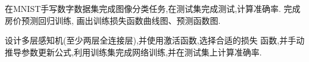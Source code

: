 在MNIST手写数字数据集完成图像分类任务,在测试集完成测试,计算准确率.
完成房价预测回归训练, 画出训练损失函数曲线图、预测函数图.

设计多层感知机(至少两层全连接层),并使用激活函数,选择合适的损失 函数,并手动推导参数更新公式,利用训练集完成网络训练,并在测试集上计算准确率.